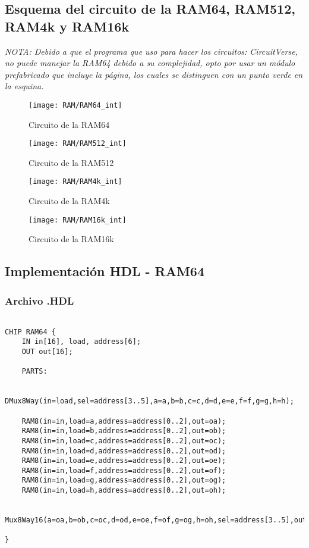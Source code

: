 \documentclass[12pt]{article}
\begin{document}
    \subsection{Esquema del circuito de la RAM64, RAM512, RAM4k y RAM16k}
		\footnotesize{\textit{NOTA: Debido a que el programa que uso para hacer los circuitos: CircuitVerse, no puede manejar la RAM64 debido a su complejidad, opto por usar un módulo prefabricado que incluye la página, los cuales se distinguen con un punto verde en la esquina.} }
		\begin{figure}[H]
			\centering
			\texttt{[image: RAM/RAM64\_int]}
			\caption{Circuito de la RAM64}
			\label{fig:ram64int}
		\end{figure}

		\begin{figure}[H]
			\centering
			\texttt{[image: RAM/RAM512\_int]}
			\caption{Circuito de la RAM512}
			\label{fig:ram512int}
		\end{figure}

		\begin{figure}[H]
			\centering
			\texttt{[image: RAM/RAM4k\_int]}
			\caption{Circuito de la RAM4k}
			\label{fig:ram4kint}
		\end{figure}

		\begin{figure}[H]
			\centering
			\texttt{[image: RAM/RAM16k\_int]}
			\caption{Circuito de la RAM16k}
			\label{fig:ram16kint}
		\end{figure}

    \subsection{Implementación HDL - RAM64}

        \subsubsection{Archivo .HDL}
        \begin{lstlisting}

CHIP RAM64 {
	IN in[16], load, address[6];
	OUT out[16];

	PARTS:

	DMux8Way(in=load,sel=address[3..5],a=a,b=b,c=c,d=d,e=e,f=f,g=g,h=h);

	RAM8(in=in,load=a,address=address[0..2],out=oa);
	RAM8(in=in,load=b,address=address[0..2],out=ob);
	RAM8(in=in,load=c,address=address[0..2],out=oc);
	RAM8(in=in,load=d,address=address[0..2],out=od);
	RAM8(in=in,load=e,address=address[0..2],out=oe);
	RAM8(in=in,load=f,address=address[0..2],out=of);
	RAM8(in=in,load=g,address=address[0..2],out=og);
	RAM8(in=in,load=h,address=address[0..2],out=oh);

	Mux8Way16(a=oa,b=ob,c=oc,d=od,e=oe,f=of,g=og,h=oh,sel=address[3..5],out=out);

}

        \end{lstlisting}
\end{document}
